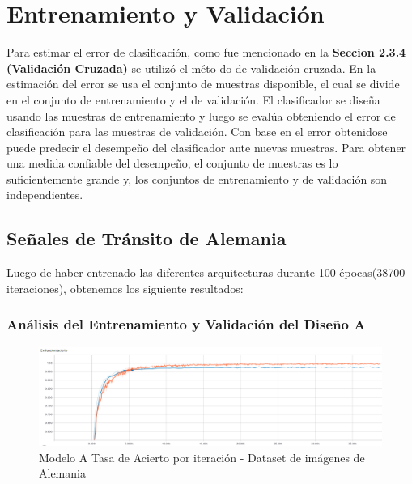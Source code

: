 \section{Entrenamiento y Validación }

	Para estimar el error de clasificación, como fue mencionado en la \textbf{Seccion 2.3.4 (Validación Cruzada)} se utilizó el méto do de validación cruzada. En la estimación del error se usa el conjunto de muestras disponible, el cual se divide en el conjunto de entrenamiento y el de validación. El clasificador se diseña usando las muestras de entrenamiento y luego se evalúa obteniendo el error de clasificación para las muestras de validación. Con base en el error obtenidose puede predecir el desempeño del clasificador ante nuevas muestras. Para obtener una medida confiable del desempeño, el conjunto de muestras es lo suficientemente grande y, los conjuntos de entrenamiento y de validación son independientes.

	\subsection{Señales de Tránsito de Alemania}

		Luego de haber entrenado las diferentes arquitecturas durante 100 épocas(38700 iteraciones), obtenemos los siguiente resultados:
	 	\subsubsection{Análisis del Entrenamiento y Validación del Diseño A}  
			\begin{figure}[H]
				\begin{center}
				\includegraphics[width=1\textwidth]{images/desarrollo/trainResults/german/model0Acierto} 
				\end{center}
				\begin{center}
				\caption{\small{Modelo A Tasa de Acierto por iteración - Dataset de imágenes de Alemania  }}
				
				{\small{\fontsize{10}{16.8}\selectfont {Fuente: Elaboración propia}}}
				\end{center}
				\vspace{-1.5em}
			\end{figure}

